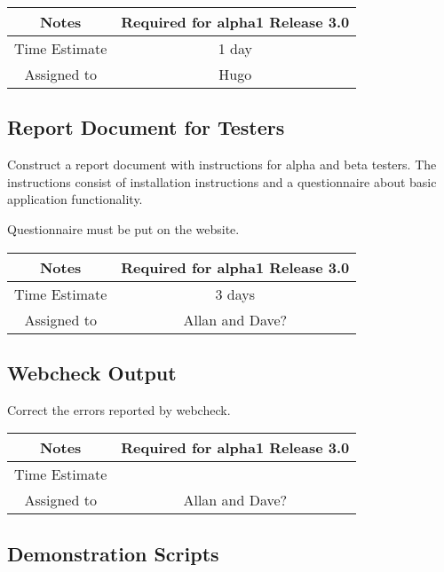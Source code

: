 \documentclass[12pt]{article}
\begin{document}
{
  \vspace{5mm}
  \centering
  \begin{tabular}{|c|c|}
    \hline
    Notes
    & Required for alpha1 Release 3.0 \\
    \hline
    Time Estimate
    & 1 day \\
    \hline
    Assigned to
    & Hugo \\
    \hline
  \end{tabular}
}


\subsection{Report Document for Testers}

Construct a report document with instructions for alpha and beta
testers.  The instructions consist of installation instructions and a
questionnaire about basic application functionality.

Questionnaire must be put on the website.


{
  \vspace{5mm}
  \centering
  \begin{tabular}{|c|c|}
    \hline
    Notes
    & Required for alpha1 Release 3.0 \\
    \hline
    Time Estimate
    & 3 days \\
    \hline
    Assigned to
    &  Allan and Dave? \\
    \hline
  \end{tabular}
}


\subsection{Webcheck Output}

Correct the errors reported by webcheck.

{
  \vspace{5mm}
  \centering
  \begin{tabular}{|c|c|}
    \hline
    Notes
    & Required for alpha1 Release 3.0 \\
    \hline
    Time Estimate
    & \\
    \hline
    Assigned to
    & Allan and Dave? \\
    \hline
  \end{tabular}
}


\subsection{Demonstration Scripts}
\end{document}
